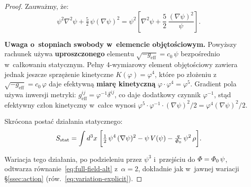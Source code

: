 \begin{proof}
Zauwa\.zmy, \.ze:
\[
  \psi^2\nabla^2\psi + \tfrac{5}{2}\,\psi(\nabla\psi)^2
  = \psi^2\!\left[\nabla^2\psi + \frac{5}{2}\,\frac{(\nabla\psi)^2}{\psi}\right].
\]

\textbf{Uwaga o~stopniach swobody w~elemencie obj\k{e}to\'sciowym.}
Powy\.zszy rachunek u\.zywa \textbf{uproszczonego} elementu
$\sqrt{-g_{\mathrm{eff}}} = c_0\,\psi$ bezpo\'srednio
w~ca\l{}kowaniu statycznym. Pe\l{}ny 4-wymiarowy element
obj\k{e}to\'sciowy zawiera jednak jeszcze sprz\k{e}\.zenie
kinetyczne $K(\varphi) = \varphi^4$, kt\'ore po z\l{}o\.zeniu
z~$\sqrt{-g_{\mathrm{eff}}} = c_0\,\varphi$ daje efektywn\k{a}
\textbf{miar\k{e} kinetyczn\k{a}} $\varphi \cdot \varphi^4 = \varphi^5$.
Gradient pola u\.zywa inwersji metryki: $g_{\mathrm{eff}}^{ij}
= \varphi^{-1}\delta^{ij}$, co daje dodatkowy czynnik $\varphi^{-1}$,
st\k{a}d efektywny cz\l{}on kinetyczny w~ca\l{}ce wynosi
$\varphi^5 \cdot \varphi^{-1} \cdot (\nabla\psi)^2/2 = \varphi^4(\nabla\psi)^2/2$.

Skr\'ocona posta\'c dzia\l{}ania statycznego:
\begin{equation}\label{eq:S-static-correct}
  S_{\mathrm{stat}} = \int d^3x\;\biggl[
    \tfrac{1}{2}\,\psi^4\,(\nabla\psi)^2
    - \psi\,V(\psi)
    - \tfrac{q}{\varPhi_0}\,\psi^2\,\rho
  \biggr].
\end{equation}

Wariacja tego dzia\l{}ania, po podzieleniu przez $\psi^3$
i~przej\'sciu do $\varPhi = \varPhi_0\,\psi$, odtwarza
r\'ownanie~\eqref{eq:full-field-alt} z~$\alpha = 2$,
dok\l{}adnie jak w~jawnej wariacji \S\ref{ssec:action}
(r\'ow.~\eqref{eq:variation-explicit}).
\end{proof}

%
%

